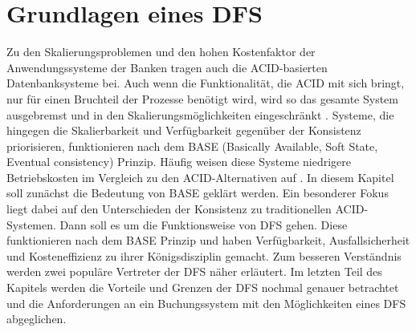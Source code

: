 \documentclass[12pt,oneside,a4paper,parskip]{scrbook}
\begin{document}
\chapter{Grundlagen eines DFS}
Zu den Skalierungsproblemen und den hohen Kostenfaktor der Anwendungssysteme der Banken tragen auch die ACID-basierten Datenbanksysteme bei. Auch wenn die Funktionalität, die ACID mit sich bringt, nur für einen Bruchteil der Prozesse benötigt wird, wird so das gesamte System ausgebremst und in den Skalierungsmöglichkeiten eingeschränkt \cite{salt}.
Systeme, die hingegen die Skalierbarkeit und Verfügbarkeit gegenüber der Konsistenz priorisieren, funktionieren nach dem BASE (Basically Available, Soft State, Eventual consistency) Prinzip. Häufig weisen diese Systeme niedrigere Betriebskosten im Vergleich zu den ACID-Alternativen auf \cite{clusterBASE}.
In diesem Kapitel soll zunächst die Bedeutung von BASE geklärt werden. Ein besonderer Fokus liegt dabei auf den Unterschieden der Konsistenz zu traditionellen ACID-Systemen. Dann soll es um die Funktionsweise von DFS gehen. Diese funktionieren nach dem BASE Prinzip und haben Verfügbarkeit, Ausfallsicherheit und Kosteneffizienz zu ihrer Königsdisziplin gemacht. Zum besseren Verständnis werden zwei populäre Vertreter der DFS näher erläutert. Im letzten Teil des Kapitels werden die Vorteile und Grenzen der DFS nochmal genauer betrachtet und die Anforderungen an ein Buchungssystem mit den Möglichkeiten eines DFS abgeglichen.
\end{document}
